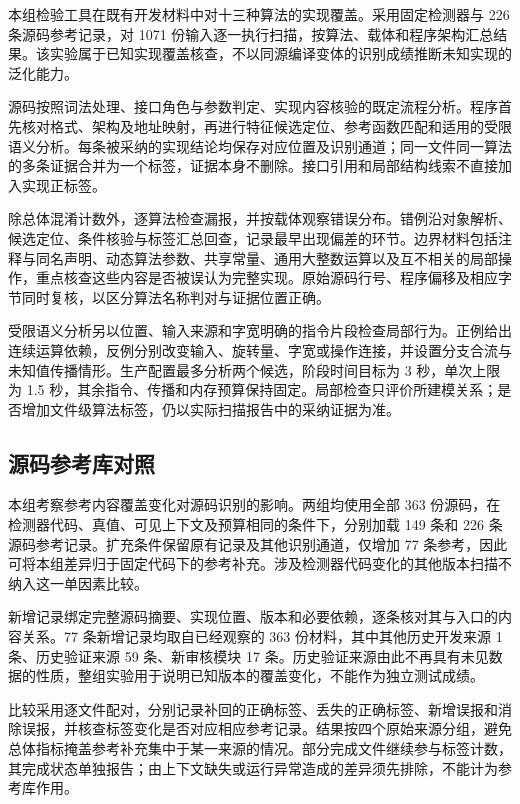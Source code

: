 本组检验工具在既有开发材料中对十三种算法的实现覆盖。采用固定检测器与 226 条源码参考记录，对 1071 份输入逐一执行扫描，按算法、载体和程序架构汇总结果。该实验属于已知实现覆盖核查，不以同源编译变体的识别成绩推断未知实现的泛化能力。

源码按照词法处理、接口角色与参数判定、实现内容核验的既定流程分析。程序首先核对格式、架构及地址映射，再进行特征候选定位、参考函数匹配和适用的受限语义分析。每条被采纳的实现结论均保存对应位置及识别通道；同一文件同一算法的多条证据合并为一个标签，证据本身不删除。接口引用和局部结构线索不直接加入实现正标签。

除总体混淆计数外，逐算法检查漏报，并按载体观察错误分布。错例沿对象解析、候选定位、条件核验与标签汇总回查，记录最早出现偏差的环节。边界材料包括注释与同名声明、动态算法参数、共享常量、通用大整数运算以及互不相关的局部操作，重点核查这些内容是否被误认为完整实现。原始源码行号、程序偏移及相应字节同时复核，以区分算法名称判对与证据位置正确。

受限语义分析另以位置、输入来源和字宽明确的指令片段检查局部行为。正例给出连续运算依赖，反例分别改变输入、旋转量、字宽或操作连接，并设置分支合流与未知值传播情形。生产配置最多分析两个候选，阶段时间目标为 3 秒，单次上限为 1.5 秒，其余指令、传播和内存预算保持固定。局部检查只评价所建模关系；是否增加文件级算法标签，仍以实际扫描报告中的采纳证据为准。

\subsection{源码参考库对照}
\label{sec:expanded-source-method}

本组考察参考内容覆盖变化对源码识别的影响。两组均使用全部 363 份源码，在检测器代码、真值、可见上下文及预算相同的条件下，分别加载 149 条和 226 条源码参考记录。扩充条件保留原有记录及其他识别通道，仅增加 77 条参考，因此可将本组差异归于固定代码下的参考补充。涉及检测器代码变化的其他版本扫描不纳入这一单因素比较。

新增记录绑定完整源码摘要、实现位置、版本和必要依赖，逐条核对其与入口的内容关系。77 条新增记录均取自已经观察的 363 份材料，其中其他历史开发来源 1 条、历史验证来源 59 条、新审核模块 17 条。历史验证来源由此不再具有未见数据的性质，整组实验用于说明已知版本的覆盖变化，不能作为独立测试成绩。

比较采用逐文件配对，分别记录补回的正确标签、丢失的正确标签、新增误报和消除误报，并核查标签变化是否对应相应参考记录。结果按四个原始来源分组，避免总体指标掩盖参考补充集中于某一来源的情况。部分完成文件继续参与标签计数，其完成状态单独报告；由上下文缺失或运行异常造成的差异须先排除，不能计为参考库作用。

